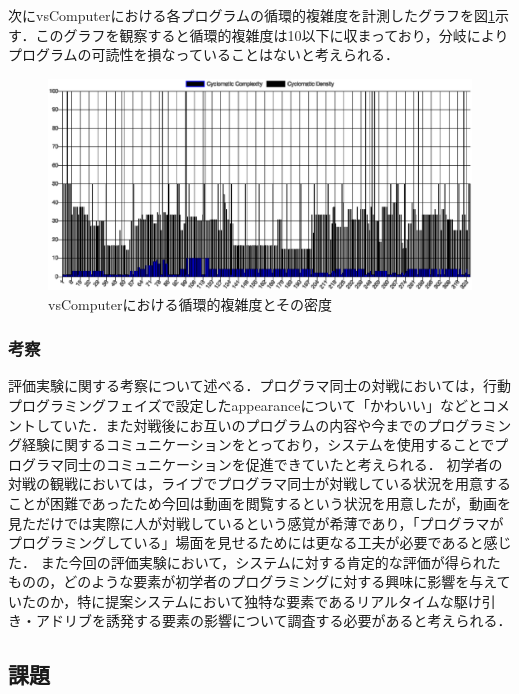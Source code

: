 \begin{enumerate}
次にvsComputerにおける各プログラムの循環的複雑度を計測したグラフを図\ref{vsComputer_cyclomatic_complexity}示す．このグラフを観察すると循環的複雑度は10以下に収まっており，分岐によりプログラムの可読性を損なっていることはないと考えられる．
\begin{figure}[!h]
  \begin{center}
    \includegraphics[width=1.0\linewidth]{image/complexity_and_density.eps}
  \end{center}
    \vspace{-8mm} 
  \caption{vsComputerにおける循環的複雑度とその密度}
  \label{vsComputer_cyclomatic_complexity}
\end{figure}
\end{enumerate}


\subsubsection{考察}
評価実験に関する考察について述べる．プログラマ同士の対戦においては，行動プログラミングフェイズで設定したappearanceについて「かわいい」などとコメントしていた．また対戦後にお互いのプログラムの内容や今までのプログラミング経験に関するコミュニケーションをとっており，システムを使用することでプログラマ同士のコミュニケーションを促進できていたと考えられる．
初学者の対戦の観戦においては，ライブでプログラマ同士が対戦している状況を用意することが困難であったため今回は動画を閲覧するという状況を用意したが，動画を見ただけでは実際に人が対戦しているという感覚が希薄であり，「プログラマがプログラミングしている」場面を見せるためには更なる工夫が必要であると感じた．
また今回の評価実験において，システムに対する肯定的な評価が得られたものの，どのような要素が初学者のプログラミングに対する興味に影響を与えていたのか，特に提案システムにおいて独特な要素であるリアルタイムな駆け引き・アドリブを誘発する要素の影響について調査する必要があると考えられる．

\subsection{課題}


